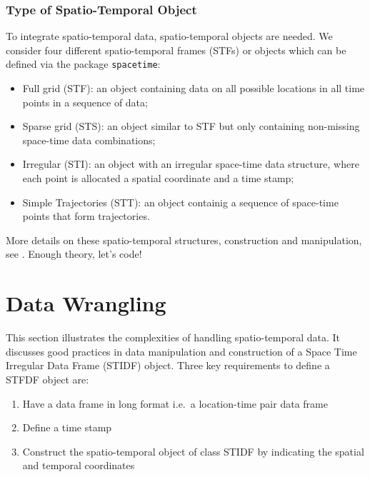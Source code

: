 \documentclass[
]{book}
\begin{document}
\hypertarget{type-of-spatio-temporal-object}{%
\subsubsection{Type of Spatio-Temporal Object}\label{type-of-spatio-temporal-object}}

To integrate spatio-temporal data, spatio-temporal objects are needed. We consider four different spatio-temporal frames (STFs) or objects which can be defined via the package \texttt{spacetime}:

\begin{itemize}
\item
  Full grid (STF): an object containing data on all possible locations in all time points in a sequence of data;
\item
  Sparse grid (STS): an object similar to STF but only containing non-missing space-time data combinations;
\item
  Irregular (STI): an object with an irregular space-time data structure, where each point is allocated a spatial coordinate and a time stamp;
\item
  Simple Trajectories (STT): an object containig a sequence of space-time points that form trajectories.
\end{itemize}

More details on these spatio-temporal structures, construction and manipulation, see \citet{pebesma2012spacetime}. Enough theory, let's code!

\hypertarget{data-wrangling}{%
\section{Data Wrangling}\label{data-wrangling}}

This section illustrates the complexities of handling spatio-temporal data. It discusses good practices in data manipulation and construction of a Space Time Irregular Data Frame (STIDF) object. Three key requirements to define a STFDF object are:

\begin{enumerate}
\def\labelenumi{\arabic{enumi}.}
\item
  Have a data frame in long format i.e.~a location-time pair data frame
\item
  Define a time stamp
\item
  Construct the spatio-temporal object of class STIDF by indicating the spatial and temporal coordinates
\end{enumerate}
\end{document}

